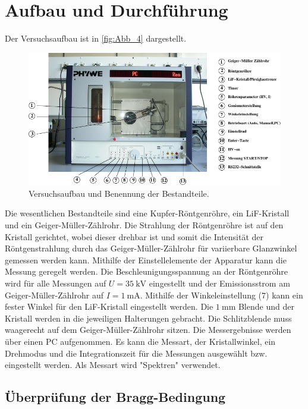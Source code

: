 \section{Aufbau und Durchführung}
\label{sec:Durchführung}

Der Versuchsaufbau ist in \autoref{fig:Abb_4} dargestellt.
\begin{figure}[H]
    \centering
    \includegraphics[width=\textwidth]{build/Abb_4.pdf}
    \caption{Versuchsaufbau und Benennung der Bestandteile.\cite{V602}}
    \label{fig:Abb_4}
\end{figure}

Die wesentlichen Bestandteile sind eine Kupfer-Röntgenröhre, ein LiF-Kristall und ein Geiger-Müller-Zählrohr.
Die Strahlung der Röntgenröhre ist auf den Kristall gerichtet, wobei dieser drehbar ist und somit die Intensität der 
Röntgenstrahlung durch das Geiger-Müller-Zählrohr für variierbare Glanzwinkel gemessen werden kann.
Mithilfe der Einstellelemente der Apparatur kann die Messung geregelt werden. Die Beschleunigungsspannung an der Röntgenröhre
wird für alle Messungen auf $U = \qty{35}{\kilo\volt}$ eingestellt und der Emissionsstrom am Geiger-Müller-Zählrohr auf $I = \qty{1}{\milli\ampere}$.
Mithilfe der Winkeleinstellung ($7$) kann ein fester Winkel für den LiF-Kristall eingestellt werden.
Die $\qty{1}{\milli\meter}$ Blende und der Kristall werden in die jeweiligen Halterungen gebracht.
Die Schlitzblende muss waagerecht auf dem Geiger-Müller-Zählrohr sitzen.
Die Messergebnisse werden über einen PC aufgenommen. 
Es kann die Messart, der Kristallwinkel, ein Drehmodus und die Integrationszeit für die Messungen ausgewählt bzw. eingestellt werden.
Als Messart wird "Spektren" verwendet.

\subsection{Überprüfung der Bragg-Bedingung} %
\label{sub:Bragg_durch}

